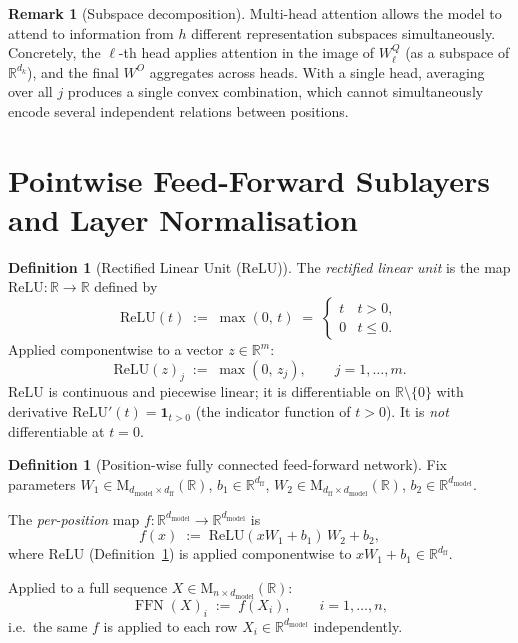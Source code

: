 \documentclass[11pt]{amsart}
\theoremstyle{plain}
\theoremstyle{definition}
\newtheorem{definition}[theorem]{Definition}
\newtheorem{remark}[theorem]{Remark}
\newcommand{\R}{\mathbb{R}}
\newcommand{\Mat}[2]{\mathrm{M}_{#1 \times #2}(\R)}
\newcommand{\FFN}{\operatorname{FFN}}
\begin{document}
\begin{remark}[Subspace decomposition]
Multi-head attention allows the model to attend to information from $h$
different representation subspaces simultaneously.  Concretely, the $\ell$-th
head applies attention in the image of $W^Q_\ell$ (as a subspace of $\R^{d_k}$),
and the final $W^O$ aggregates across heads.  With a single head, averaging
over all $j$ produces a single convex combination, which cannot simultaneously
encode several independent relations between positions.
\end{remark}

\section{Pointwise Feed-Forward Sublayers and Layer Normalisation}
\label{sec:ffn}

\begin{definition}[Rectified Linear Unit (ReLU)]
\label{def:relu}
The \emph{rectified linear unit} is the map $\mathrm{ReLU} : \R \to \R$ defined by
\[
    \mathrm{ReLU}(t) \;:=\; \max(0,\, t)
    \;=\; \begin{cases} t & t > 0, \\ 0 & t \leq 0. \end{cases}
\]
Applied componentwise to a vector $z \in \R^m$:
\[
    \mathrm{ReLU}(z)_j \;:=\; \max(0,\, z_j), \qquad j = 1, \ldots, m.
\]
$\mathrm{ReLU}$ is continuous and piecewise linear; it is differentiable on
$\R \setminus \{0\}$ with derivative
$\mathrm{ReLU}'(t) = \mathbf{1}_{t > 0}$ (the indicator function of $t>0$).
It is \emph{not} differentiable at $t = 0$.
\end{definition}

\begin{definition}[Position-wise fully connected feed-forward network]
\label{def:ffn}
Fix parameters $W_1 \in \Mat{d_{\mathrm{model}}}{d_{\mathrm{ff}}}$,
$b_1 \in \R^{d_{\mathrm{ff}}}$,
$W_2 \in \Mat{d_{\mathrm{ff}}}{d_{\mathrm{model}}}$,
$b_2 \in \R^{d_{\mathrm{model}}}$.

The \emph{per-position} map $f : \R^{d_{\mathrm{model}}} \to \R^{d_{\mathrm{model}}}$ is
\[
    f(x) \;:=\; \mathrm{ReLU}(xW_1 + b_1)\,W_2 + b_2,
\]
where $\mathrm{ReLU}$ (Definition~\ref{def:relu}) is applied componentwise to
$xW_1 + b_1 \in \R^{d_{\mathrm{ff}}}$.

Applied to a full sequence $X \in \Mat{n}{d_{\mathrm{model}}}$:
\[
    \FFN(X)_i \;:=\; f(X_i), \qquad i = 1, \ldots, n,
\]
i.e.\ the same $f$ is applied to each row $X_i \in \R^{d_{\mathrm{model}}}$
independently.
\end{definition}
\end{document}
